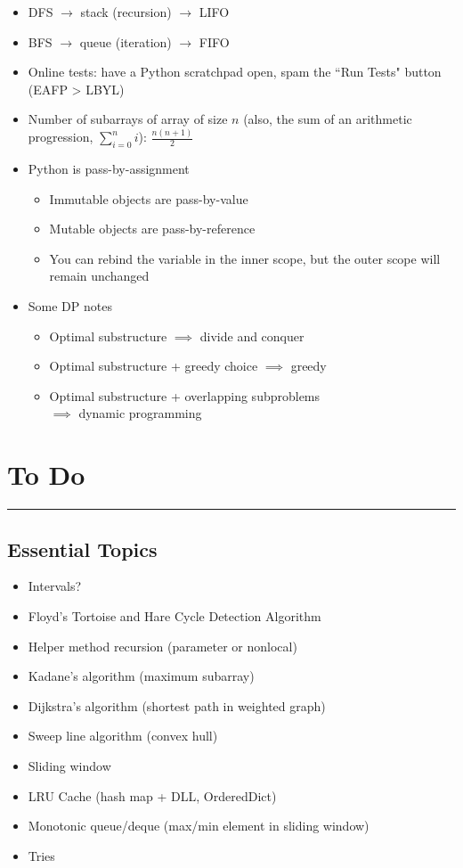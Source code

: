 \documentclass[12pt, titlepage]{article}
\begin{document}
\begin{itemize}
  \item DFS $\rightarrow$ stack (recursion) $\rightarrow$ LIFO
  \item BFS $\rightarrow$ queue (iteration) $\rightarrow$ FIFO
  \item Online tests: have a Python scratchpad open, spam the ``Run Tests" button (EAFP > LBYL)
  \item Number of subarrays of array of size $n$ (also, the sum of an arithmetic progression, $\sum_{i=0}^{n}i$): $\frac{n(n+1)}{2}$
  \item Python is pass-by-assignment
  \begin{itemize}
    \item Immutable objects are pass-by-value
    \item Mutable objects are pass-by-reference
    \item You can rebind the variable in the inner scope, but the outer scope will remain unchanged
  \end{itemize}
  \item Some DP notes
  \begin{itemize}
    \item Optimal substructure $\implies$ divide and conquer
    \item Optimal substructure + greedy choice $\implies$ greedy
    \item Optimal substructure + overlapping subproblems \\
          \-\hspace{1em}$\implies$ dynamic programming
  \end{itemize}
\end{itemize}

\section{To Do}
\hrule\vspace{5ex}

\subsection{Essential Topics}
\begin{itemize}
  \item Intervals?
  \item Floyd's Tortoise and Hare Cycle Detection Algorithm
  \item Helper method recursion (parameter or nonlocal)
  \item Kadane's algorithm (maximum subarray)
  \item Dijkstra's algorithm (shortest path in weighted graph)
  \item Sweep line algorithm (convex hull)
  \item Sliding window
  \item LRU Cache (hash map + DLL, OrderedDict)
  \item Monotonic queue/deque (max/min element in sliding window) %
  \item Tries
\end{itemize}
\end{document}
